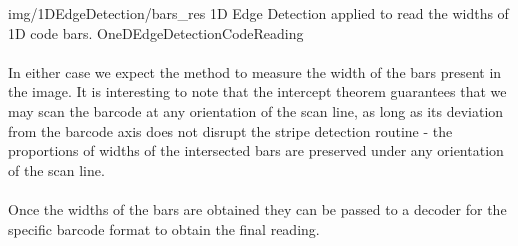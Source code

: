 \oneFigure
{img/1DEdgeDetection/bars_res}
{1D Edge Detection applied to read the widths of 1D code bars.}
{OneDEdgeDetectionCodeReading}
{\basicWidth}

\paragraph*{}
In either case we expect the method to measure the width of the bars present in the image. It is interesting to note that the intercept theorem guarantees that we may scan the barcode at any orientation of the scan line, as long as its deviation from the barcode axis does not disrupt the stripe detection routine - the proportions of widths of the intersected bars are preserved under any orientation of the scan line.

\paragraph*{}
Once the widths of the bars are obtained they can be passed to a decoder for the specific barcode format to obtain the final reading.







